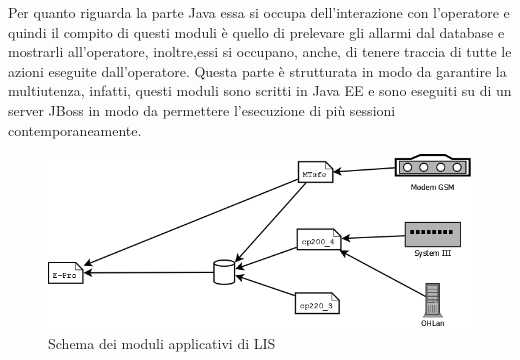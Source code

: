 Per quanto riguarda la parte Java essa si occupa dell'interazione con l'operatore e quindi il compito di questi moduli è quello di prelevare gli allarmi dal database e mostrarli all'operatore, inoltre,essi si occupano, anche, di tenere traccia di tutte le azioni eseguite dall'operatore. Questa parte è strutturata in modo da garantire la multiutenza, infatti, questi moduli sono scritti in Java EE e sono eseguiti su di un server JBoss in modo da permettere l'esecuzione di più sessioni contemporaneamente.
\begin{figure}
\centering
\includegraphics[width=0.9\linewidth]{pictures/struttura.png}
\caption{Schema dei moduli applicativi di LIS}\label{img:struttura}
\end{figure}

